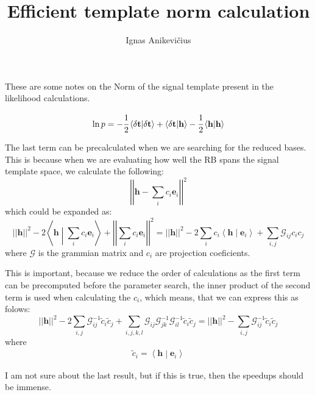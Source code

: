\documentclass{scrartcl}
\author{Ignas Anikevičius}
\title{Efficient template norm calculation}
\renewcommand{\vec}[1]{\ensuremath{\mathbf{#1}}}
\newcommand{\braket}[2]{\ensuremath{\left\langle #1 \middle| #2 \right\rangle}}
\newcommand{\norm}[1]{\ensuremath{\left|\left| #1 \right|\right|}}
\begin{document}
    \maketitle

    These are some notes on the Norm of the signal template present in the
    likelihood calculations.

    \begin{equation}
        \ln p = -\cfrac{1}{2} \braket{\delta\vec{t}}{\delta\vec{t}} 
        + \braket{\delta\vec{t}}{\vec{h}} 
        -\cfrac{1}{2} \braket{\vec{h}}{\vec{h}}
    \end{equation}

    The last term can be precalculated when we are searching for the reduced
    bases.
    This is because when we are evaluating how well the RB spans the signal
    template space, we calculate the following:
    \begin{equation}
        \norm{\vec{h} - \sum_{i} c_{i} \vec{e}_{i}}^{2}
    \end{equation}
    which could be expanded as:
    \begin{equation}
        \norm{\vec{h}}^{2}
        - 2 \braket{\vec{h}}{\sum_{i} c_{i} \vec{e}_{i}}
        + \norm{\sum_{i} c_{i} \vec{e}_{i}}^2
        =
        \norm{\vec{h}}^{2}
        - 2 \sum_{i} c_{i} \braket{\vec{h}}{\vec{e}_{i}}
        + \sum_{i,j} \mathcal{G}_{ij} c_{i} c_{j} 
    \end{equation}
    where $\mathcal{G}$ is the grammian matrix and $c_i$ are projection
    coeficients.

    This is important, because we reduce the order of calculations as the first
    term can be precomputed before the parameter search, the inner product of the
    second term is used when calculating the $c_{i}$, which means, that we can
    express this as folows:
    \begin{equation}
        \norm{\vec{h}}^{2}
        - 2 \sum_{i,j} \mathcal{G}^{-1}_{ij} \widetilde{c}_{i} \widetilde{c}_{j}
        + \sum_{i,j,k,l} \mathcal{G}_{ij} \mathcal{G}^{-1}_{jk}  \mathcal{G}^{-1}_{il} \widetilde{c}_{i} \widetilde{c}_{j}
        =
        \norm{\vec{h}}^{2}
        - \sum_{i,j} \mathcal{G}^{-1}_{ij} \widetilde{c}_{i} \widetilde{c}_{j}
    \end{equation}
    where
    \begin{align}
        \widetilde{c}_{i} = \braket{\vec{h}}{\vec{e}_{i}}
    \end{align}

    I am not sure about the last result, but if this is true, then the speedups
    should be immense.
\end{document}
